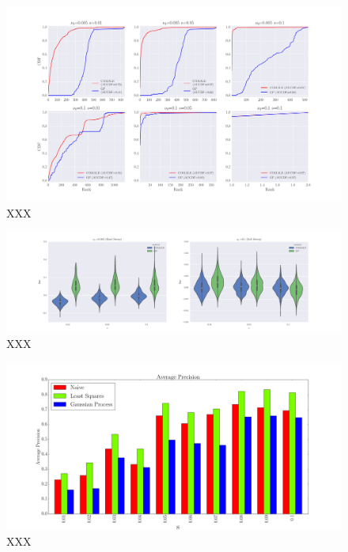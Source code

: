 \begin{figure}[h]
  \centering
    \includegraphics[width=\textwidth]{rank}
  \caption{XXX}
  \label{fig:Fig3}
\end{figure}
\begin{figure}[h]
  \centering
    \includegraphics[width=\textwidth]{bias}
  \caption{XXX}
  \label{fig:Fig4}
\end{figure}

\begin{figure}[hh]
  \centering
    \includegraphics[width=\textwidth]{ap}
  \caption{XXX}
  \label{fig:Fig5}
\end{figure}
